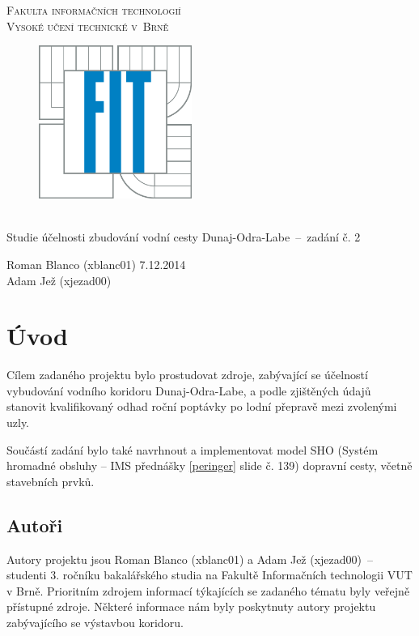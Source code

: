 \documentclass[11pt,a4paper]{article}
\begin{document}
  \begin{titlepage}
    \begin{center}
      \Huge
      \textsc{Fakulta informačních technologií\\ Vysoké učení technické v~Brně}
      \vspace{100px}
      \begin{figure}[!h]
        \centering
        \includegraphics[height=5cm]{logo.jpg}
      \end{figure}
      \\[50mm]
      \LARGE{Studie účelnosti zbudování vodní cesty Dunaj-Odra-Labe \,--\, 
             zadání č. 2}
      \vfill
    \end{center}
    \Large{Roman Blanco (xblanc01) \hfill 7.12.2014 \\
           Adam Jež (xjezad00)}
  \end{titlepage}

  \tableofcontents
  \newpage

  \section{Úvod}

    Cílem zadaného projektu bylo prostudovat zdroje, zabývající se účelností
    vybudování vodního koridoru Dunaj-Odra-Labe, a podle zjištěných údajů
    stanovit kvalifikovaný odhad roční poptávky po lodní přepravě mezi
    zvolenými uzly. 

    Součástí zadání bylo také navrhnout a implementovat model SHO
    (Systém hromadné obsluhy -- IMS přednášky \ref{peringer} slide č. 139)
    dopravní cesty, včetně
    stavebních prvků.

    \subsection{Autoři}

      Autory projektu jsou Roman Blanco (xblanc01) a Adam Jež (xjezad00) \,--\,
      studenti 3. ročníku bakalářského studia na Fakultě Informačních
      technologii VUT v Brně. Prioritním zdrojem informací týkajících se
      zadaného tématu byly veřejně přístupné zdroje. Některé informace nám
      byly poskytnuty autory projektu zabývajícího se výstavbou koridoru.
\end{document}
